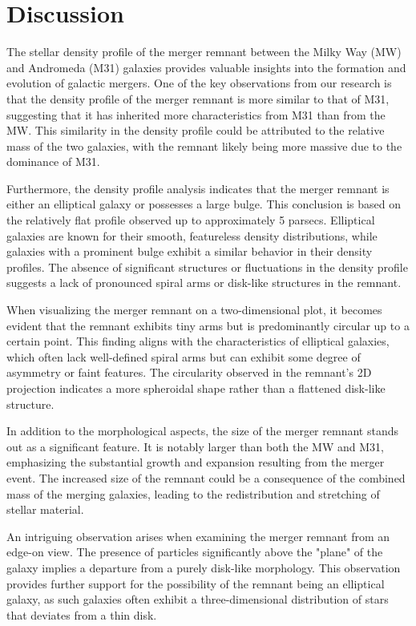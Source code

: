 \documentclass[preprint2, times]{aastex631}
\begin{document}
\section{Discussion}
The stellar density profile of the merger remnant between the Milky Way (MW) and Andromeda (M31) galaxies provides valuable insights into the formation and evolution of galactic mergers. One of the key observations from our research is that the density profile of the merger remnant is more similar to that of M31, suggesting that it has inherited more characteristics from M31 than from the MW. This similarity in the density profile could be attributed to the relative mass of the two galaxies, with the remnant likely being more massive due to the dominance of M31.

Furthermore, the density profile analysis indicates that the merger remnant is either an elliptical galaxy or possesses a large bulge. This conclusion is based on the relatively flat profile observed up to approximately 5 parsecs. Elliptical galaxies are known for their smooth, featureless density distributions, while galaxies with a prominent bulge exhibit a similar behavior in their density profiles. The absence of significant structures or fluctuations in the density profile suggests a lack of pronounced spiral arms or disk-like structures in the remnant.

When visualizing the merger remnant on a two-dimensional plot, it becomes evident that the remnant exhibits tiny arms but is predominantly circular up to a certain point. This finding aligns with the characteristics of elliptical galaxies, which often lack well-defined spiral arms but can exhibit some degree of asymmetry or faint features. The circularity observed in the remnant's 2D projection indicates a more spheroidal shape rather than a flattened disk-like structure.

In addition to the morphological aspects, the size of the merger remnant stands out as a significant feature. It is notably larger than both the MW and M31, emphasizing the substantial growth and expansion resulting from the merger event. The increased size of the remnant could be a consequence of the combined mass of the merging galaxies, leading to the redistribution and stretching of stellar material.

An intriguing observation arises when examining the merger remnant from an edge-on view. The presence of particles significantly above the "plane" of the galaxy implies a departure from a purely disk-like morphology. This observation provides further support for the possibility of the remnant being an elliptical galaxy, as such galaxies often exhibit a three-dimensional distribution of stars that deviates from a thin disk.
\end{document}
